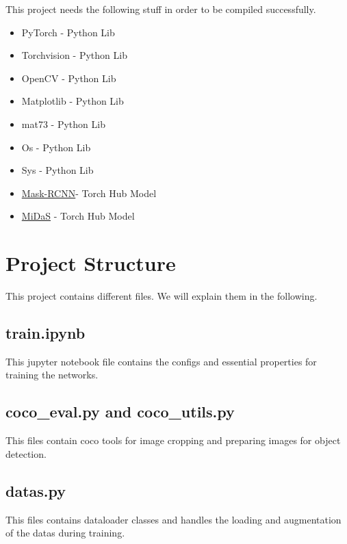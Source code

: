 \documentclass[a4paper, openany]{book}
\begin{document}
This project needs the following stuff in order to be compiled successfully.

\begin{itemize}
\item PyTorch - Python Lib
\item Torchvision - Python Lib
\item OpenCV - Python Lib
\item Matplotlib - Python Lib
\item mat73 - Python Lib
\item Os - Python Lib
\item Sys - Python Lib
\item \href{https://pytorch.org/vision/stable/_modules/torchvision/models/detection/mask_rcnn.html}{Mask-RCNN}- Torch Hub Model
\item \href{https://pytorch.org/hub/intelisl_midas_v2/}{MiDaS} - Torch Hub Model


\end{itemize}



\newpage

\section{Project Structure}
	\vspace{0.3cm}
	
This project contains different files. We will explain them in the following.
\subsection{train.ipynb}
	\vspace{0.3cm}
	
This jupyter notebook file contains the configs and essential properties for training the networks.

\subsection{coco\_eval.py and coco\_utils.py}
	\vspace{0.3cm}
This files contain coco tools for image cropping and preparing images for object detection.

\subsection{datas.py}
	\vspace{0.3cm}
This files contains dataloader classes and handles the loading and augmentation of the datas during training.
\end{document}
